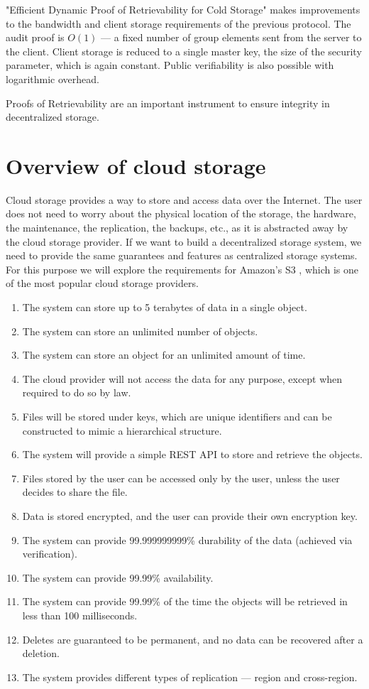 "Efficient Dynamic Proof of Retrievability for Cold Storage" makes improvements to the bandwidth and
client storage requirements of the previous protocol.
The audit proof is $O(1)$ --- a fixed number of group elements sent from the server to the client.
Client storage is reduced to a single master key, the size of the security parameter,
which is again constant.
Public verifiability is also possible with logarithmic overhead.

Proofs of Retrievability are an important instrument to ensure integrity in decentralized storage.

\label{section:cloud}
\section{Overview of cloud storage}

Cloud storage provides a way to store and access data over the Internet.
The user does not need to worry about the physical location of the storage, the hardware, the maintenance,
the replication, the backups, etc., as it is abstracted away by the cloud storage provider.
If we want to build a decentralized storage system, we need to provide the same guarantees and features
as centralized storage systems.
For this purpose we will explore the requirements for Amazon's S3 \cite{s3-faq},
which is one of the most popular cloud storage providers.

\begin{enumerate}
    \item The system can store up to 5 terabytes of data in a single object.
    \item The system can store an unlimited number of objects.
    \item The system can store an object for an unlimited amount of time.
    \item The cloud provider will not access the data for any purpose, except when required to do so by law.
    \item Files will be stored under keys, which are unique identifiers and
        can be constructed to mimic a hierarchical structure.
    \item The system will provide a simple REST API to store and retrieve the objects.
    \item Files stored by the user can be accessed only by the user, unless the user decides to share the file.
    \item Data is stored encrypted, and the user can provide their own encryption key.
    \item The system can provide 99.999999999\% durability of the data (achieved via verification).
    \item The system can provide 99.99\% availability.
    \item The system can provide 99.99\% of the time the objects will be retrieved in less than 100 milliseconds.
    \item Deletes are guaranteed to be permanent, and no data can be recovered after a deletion.
    \item The system provides different types of replication --- region and cross-region.
\end{enumerate}

